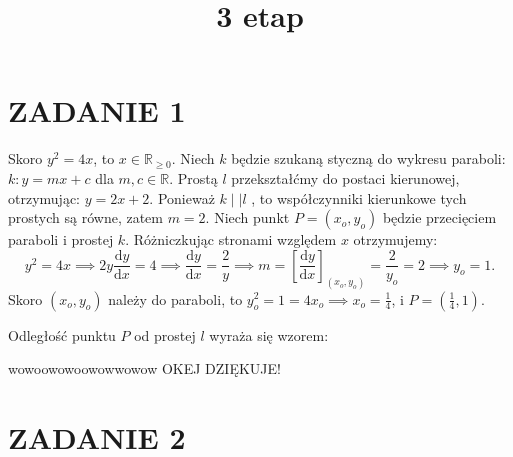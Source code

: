 \documentclass{article}
\title{3 etap}
\date{}
\begin{document}


\section*{ZADANIE 1}
Skoro \(y^2 = 4x\), to \(x\in\mathbb{R}_{\geq 0}\). Niech \(k\) będzie szukaną styczną do wykresu paraboli: \(k: y = mx+c\) dla \(m, c \in \mathbb{R}\). Prostą \(l\) przekształćmy do postaci kierunowej, otrzymując: \(y = 2x+2\). Ponieważ \(k \mid \mid  l\) , to współczynniki kierunkowe tych prostych są równe, zatem \(m = 2\). Niech punkt \(P = (x_o, y_o)\) będzie przecięciem paraboli i prostej \(k\). Różniczkując stronami względem \(x\) otrzymujemy:
\[
    y^2 = 4x \implies 2y \frac{\mathrm{d}y}{\mathrm{d}x} = 4 \implies \frac{\mathrm{d}y}{\mathrm{d}x} =\frac{2}{y} \implies
     m = \left[\frac{\mathrm{d}y}{\mathrm{d}x}\right]_{(x_o, y_o)} = \frac{2}{y_o} = 2 \implies y_o = 1.
\]
Skoro \((x_o, y_o)\) należy do paraboli, to \(y_o^2 = 1 = 4x_o \implies x_o = \frac{1}{4}\), i \(P = (\frac{1}{4}, 1)\).

Odległość punktu \(P\) od prostej \(l\) wyraża się wzorem: 
\[
    
\]

\begin{tcolorbox}[colback=red!5!white,colframe=red!75!black,title=Rozwiązanie]
    wowoowowoowowwowow OKEJ DZIĘKUJE!
\end{tcolorbox}

\section*{ZADANIE 2}
\end{document}
